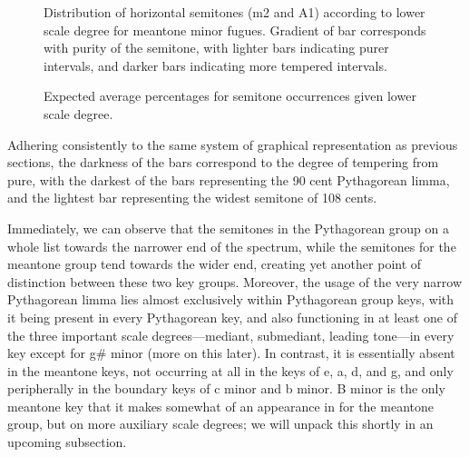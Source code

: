 \begin{figure}[H]
    \begin{center}
    \caption[Distribution of horizontal semitones, according to lower scale degree for meantone minor fugues. ]{Distribution of horizontal semitones (m2 and A1) according to lower scale degree for meantone minor fugues. Gradient of bar corresponds with purity of the semitone, with lighter bars indicating purer intervals, and darker bars indicating more tempered intervals.}
    \end{center}
\end{figure}
    



\begin{figure}[H]
    \begin{center}
    \caption{Expected average percentages for semitone occurrences given lower scale degree. }
    \end{center}
\end{figure}
    
    Adhering consistently to the same system of graphical representation as
previous sections, the darkness of the bars correspond to the degree of
tempering from pure, with the darkest of the bars representing the 90
cent Pythagorean limma, and the lightest bar representing the widest
semitone of 108 cents.

Immediately, we can observe that the semitones in the Pythagorean group
on a whole list towards the narrower end of the spectrum, while the
semitones for the meantone group tend towards the wider end, creating
yet another point of distinction between these two key groups. Moreover,
the usage of the very narrow Pythagorean limma lies almost exclusively
within Pythagorean group keys, with it being present in every
Pythagorean key, and also functioning in at least one of the three
important scale degrees---mediant, submediant, leading tone---in
every key except for g\# minor (more on this later). In contrast, it is
essentially absent in the meantone keys, not occurring at all in the
keys of e, a, d, and g, and only peripherally in the boundary keys of c
minor and b minor. B minor is the only meantone key that it makes
somewhat of an appearance in for the meantone group, but on more
auxiliary scale degrees; we will unpack this shortly in an upcoming
subsection.

